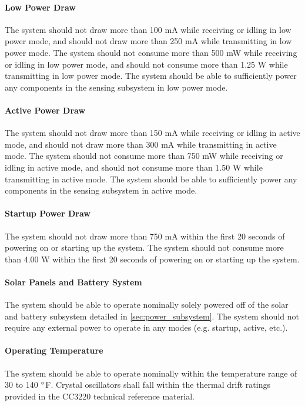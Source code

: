 \paragraph{Low Power Draw} The system should not draw more than 100 mA while
receiving or idling in low power mode, and should not draw more than 250
mA while transmitting in low power mode. The system should not consume more
than 500 mW while receiving or idling in low power mode, and should not
consume more than 1.25 W while transmitting in low power mode. The system
should be able to sufficiently power any components in the sensing subsystem in
low power mode.

\paragraph{Active Power Draw} The system should not draw more than 150 mA while
receiving or idling in active mode, and should not draw more than 300
mA while transmitting in active mode. The system should not consume more
than 750 mW while receiving or idling in active mode, and should not
consume more than 1.50 W while transmitting in active mode. The system
should be able to sufficiently power any components in the sensing subsystem in
active mode.

\paragraph{Startup Power Draw} The system should not draw more than 750 mA
within the first 20 seconds of powering on or starting up the system. The
system should not consume more than 4.00 W within the first 20 seconds of
powering on or starting up the system.

\paragraph{Solar Panels and Battery System} The system should be able to
operate nominally solely powered off of the solar and battery subsystem
detailed in \autoref{sec:power_subsystem}. The system should not require any
external power to operate in any modes (e.g. startup, active, etc.).

\paragraph{Operating Temperature} The system should be able to operate
nominally within the temperature range of 30 to 140 $\degree$F. Crystal
oscillators shall fall within the thermal drift ratings provided in the
CC3220 technical reference material.

